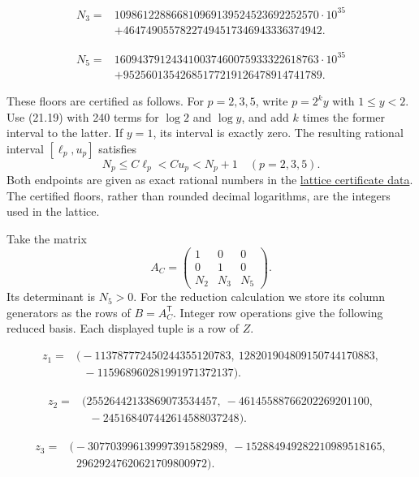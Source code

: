 \documentclass[
  11pt,
  a4paper,
]{article}
\begin{document}
\[
\begin{aligned}
N_3={}&109861228866810969139524523692252570\cdot10^{35}\\
&+46474905578227494517346943336374942.
\end{aligned}
\]

\[
\begin{aligned}
N_5={}&160943791243410037460075933322618763\cdot10^{35}\\
&+95256013542685177219126478914741789.
\end{aligned}
\]

These floors are certified as follows. For \(p=2,3,5\), write
\(p=2^k y\) with \(1\le y<2\). Use (21.19) with 240 terms for \(\log2\)
and \(\log y\), and add \(k\) times the former interval to the latter.
If \(y=1\), its interval is exactly zero. The resulting rational
interval \([\ell_p,u_p]\) satisfies \[
 N_p\le C\ell_p<C u_p<N_p+1
 \quad(p=2,3,5).
 \tag{21.21}
\] Both endpoints are given as exact rational numbers in the
\href{https://kokunoyumeto.github.io/open-math-courses-public/courses/TR-BAKER/verification/reduction-lattice-check.json}{lattice certificate
data}. The certified floors, rather than rounded decimal logarithms, are
the integers used in the lattice.

Take the matrix \[
 A_C=
 \begin{pmatrix}
 1&0&0\\0&1&0\\N_2&N_3&N_5
 \end{pmatrix}.
\] Its determinant is \(N_5>0\). For the reduction calculation we store
its column generators as the rows of \(B=A_C^{\mathsf T}\). Integer row
operations give the following reduced basis. Each displayed tuple is a
row of \(Z\).

\[
\begin{aligned}
z_1={}&\bigl(-113787772450244355120783,\ 128201904809150744170883,\\
&\phantom{(}\ -115968960281991971372137\bigr).
\end{aligned}
\]

\[
\begin{aligned}
z_2={}&\bigl(25526442133869073534457,\ -46145588766202269201100,\\
&\phantom{(}\ -245168407442614588037248\bigr).
\end{aligned}
\]

\[
\begin{aligned}
z_3={}&\bigl(-307703996139997391582989,\ -152884949282210989518165,\\
&\phantom{(}\ 29629247620621709800972\bigr).
\end{aligned}
\]
\end{document}
